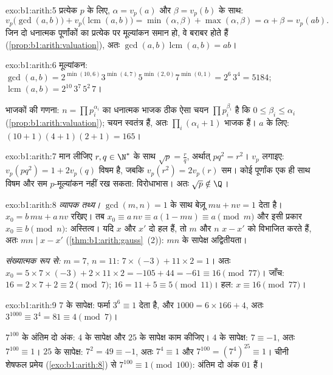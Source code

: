 \begin{solution}{exo:b1:arith:5}
प्रत्येक  $p$ के लिए, $\alpha = v_p(a)$ और $\beta = v_p(b)$ के साथ:
\[
v_p\bigl(\gcd(a,b)\bigr) + v_p\bigl(\operatorname{lcm}(a,b)\bigr)
= \min(\alpha, \beta) + \max(\alpha, \beta)
= \alpha + \beta = v_p(ab) .
\]
जिन दो धनात्मक पूर्णांकों का प्रत्येक  पर मूल्यांकन समान हो, वे बराबर
होते हैं (\cref{prop:b1:arith:valuation}), अतः
$\gcd(a,b)\operatorname{lcm}(a,b) = ab$।
\end{solution}

\begin{solution}{exo:b1:arith:6}
मूल्यांकन: $\gcd(a, b) = 2^{\min(10,6)} 3^{\min(4,7)} 5^{\min(2,0)}
7^{\min(0,1)} = 2^6\, 3^4 = 5184$; $\operatorname{lcm}(a,b) = 2^{10}\, 3^7\,
5^2\, 7$।

भाजकों की गणना: $n = \prod p_i^{\alpha_i}$ का धनात्मक भाजक ठीक ऐसा चयन
$\prod p_i^{\beta_i}$ है कि $0 \leq \beta_i \leq \alpha_i$
(\cref{prop:b1:arith:valuation}); चयन स्वतंत्र हैं, अतः $\prod_i (\alpha_i +
1)$ भाजक हैं। $a$ के लिए: $(10+1)(4+1)(2+1) = 165$।
\end{solution}

\begin{solution}{exo:b1:arith:7}
मान लीजिए $r, q \in \N^*$ के साथ $\sqrt p = \frac rq$, अर्थात् $p q^2 =
r^2$। $v_p$ लगाइए: $v_p(pq^2) = 1 + 2v_p(q)$ विषम है, जबकि $v_p(r^2) = 2
v_p(r)$ सम। कोई पूर्णांक एक ही साथ विषम और सम $p$-मूल्यांकन नहीं रख सकता:
विरोधाभास। अतः $\sqrt p \notin \Q$।
\end{solution}

\begin{solution}{exo:b1:arith:8}
\emph{व्यापक तथ्य।} $\gcd(m,n) = 1$ के साथ बेज़ू $mu + nv = 1$ देता है। $x_0
= b\,mu + a\,nv$ रखिए। तब $x_0 \equiv a\,nv \equiv a(1 - mu) \equiv a \pmod
m$ और इसी प्रकार $x_0 \equiv b \pmod n$: अस्तित्व। यदि $x$ और $x'$ दो हल
हैं, तो $m$ और $n$ $x - x'$ को विभाजित करते हैं, अतः $mn \mid x - x'$
(\cref{thm:b1:arith:gauss}~(2)): $mn$ के सापेक्ष अद्वितीयता।

\emph{संख्यात्मक रूप से:} $m = 7$, $n = 11$: $7 \times (-3) + 11 \times 2 =
1$। अतः $x_0 = 5 \times 7 \times (-3) + 2 \times 11 \times 2 = -105 + 44 =
-61 \equiv 16 \pmod{77}$। जाँच: $16 = 2\times 7 + 2 \equiv 2 \pmod 7$; $16 =
11 + 5 \equiv 5 \pmod{11}$। हल: $x \equiv 16 \pmod{77}$।
\end{solution}

\begin{solution}{exo:b1:arith:9}
$7$ के सापेक्ष: फर्मा $3^6 \equiv 1$ देता है, और $1000 = 6 \times 166 + 4$,
अतः $3^{1000} \equiv 3^4 = 81 \equiv 4 \pmod 7$।

$7^{100}$ के अंतिम दो अंक: $4$ के सापेक्ष और $25$ के सापेक्ष काम कीजिए। $4$
के सापेक्ष: $7 \equiv -1$, अतः $7^{100} \equiv 1$। $25$ के सापेक्ष: $7^2 =
49 \equiv -1$, अतः $7^4 \equiv 1$ और $7^{100} = (7^4)^{25} \equiv 1$। चीनी
शेषफल प्रमेय (\cref{exo:b1:arith:8}) से $7^{100} \equiv 1 \pmod{100}$: अंतिम
दो अंक $01$ हैं।
\end{solution}

